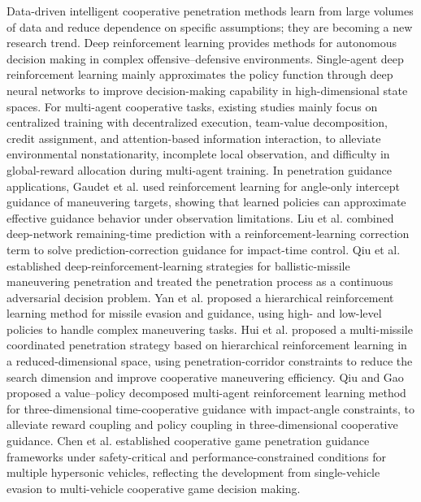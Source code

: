 \documentclass[unbranded]{cja}
\begin{document}
Data-driven intelligent cooperative penetration methods learn from large volumes of data and reduce dependence on specific assumptions; they are becoming a new research trend.
Deep reinforcement learning provides methods for autonomous decision making in complex offensive--defensive environments. Single-agent deep reinforcement learning mainly approximates the policy function through deep neural networks to improve decision-making capability in high-dimensional state spaces\cite{Mnih2015Nature,Schulman2017PPO}.
For multi-agent cooperative tasks, existing studies mainly focus on centralized training with decentralized execution\cite{Lowe2017MADDPG,Yu2022MAPPO}, team-value decomposition\cite{Sunehag2018VDN,Rashid2020JMLR}, credit assignment\cite{Foerster2018COMA}, and attention-based information interaction\cite{Iqbal2019MAAC}, to alleviate environmental nonstationarity, incomplete local observation, and difficulty in global-reward allocation during multi-agent training.
In penetration guidance applications, Gaudet et al.\cite{Gaudet2020AST} used reinforcement learning for angle-only intercept guidance of maneuvering targets, showing that learned policies can approximate effective guidance behavior under observation limitations. Liu et al.\cite{Liu2021AST} combined deep-network remaining-time prediction with a reinforcement-learning correction term to solve prediction-correction guidance for impact-time control. Qiu et al.\cite{Qiu2022JAE} established deep-reinforcement-learning strategies for ballistic-missile maneuvering penetration and treated the penetration process as a continuous adversarial decision problem. Yan et al.\cite{Yan2022SciRep} proposed a hierarchical reinforcement learning method for missile evasion and guidance, using high- and low-level policies to handle complex maneuvering tasks. Hui et al.\cite{Hui2025CJA} proposed a multi-missile coordinated penetration strategy based on hierarchical reinforcement learning in a reduced-dimensional space, using penetration-corridor constraints to reduce the search dimension and improve cooperative maneuvering efficiency. Qiu and Gao\cite{Qiu2024AST} proposed a value--policy decomposed multi-agent reinforcement learning method for three-dimensional time-cooperative guidance with impact-angle constraints, to alleviate reward coupling and policy coupling in three-dimensional cooperative guidance. Chen et al.\cite{Chen2024CJA,Chen2024TAES} established cooperative game penetration guidance frameworks under safety-critical and performance-constrained conditions for multiple hypersonic vehicles, reflecting the development from single-vehicle evasion to multi-vehicle cooperative game decision making.
\end{document}

